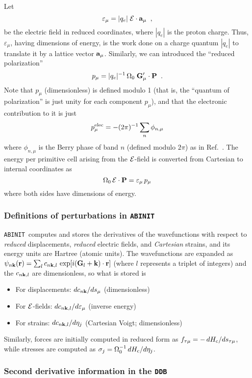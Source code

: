 \documentclass[11pt,fleqn]{article}
\def\beq{\begin{equation}}
\def\eeq{\end{equation}}
\def\P{{\bf P}}
\def\a{{\bf a}}
\def\E{{\cal E}}
\def\G{{\bf G}}
\def\r{{\bf r}}
\def\k{{\bf k}}
\def\Oo{\Omega_0}
\def\bc{_{\rm c}}
\def\veps{\varepsilon}
\def\ABINIT{{{\tt ABINIT}}}
\def\DDB{{\tt DDB}}
\begin{document}
Let
%
\beq
\veps_\mu=|q_e|\;\E\cdot \a_\mu \;\;,
\eeq
%
be the electric field in reduced coordinates, where $|q_e|$ is the
proton charge.  Thus, $\veps_\mu$, having dimensions of energy, is
the work done on a charge quantum $|q_e|$ to translate it by a lattice
vector $\a_\mu$.  Similarly, we can introduced the ``reduced
polarization''
%
\beq
p_\mu=|q_e|^{-1}\,\Oo\;\G'_\mu\cdot\P
\;\;.
\eeq
%
Note that $p_\mu$ (dimensionless) is defined modulo 1
(that is, the ``quantum of
polarization'' is just unity for each component $p_\mu$), and
that the electronic contribution to it is just
%
\beq
p_\mu^{\rm elec}=-(2\pi)^{-1}\sum_n\phi_{n,\mu}
\label{eq:pelec}
\eeq
%
where $\phi_{n,\mu}$ is the Berry phase of band $n$ (defined modulo
$2\pi$) as in Ref.~\cite{dv-piezo}.  The energy per primitive cell
arising from the $\E$-field is converted from Cartesian to internal
coordinates as
%
\beq
\Oo\,\E\cdot\P=\veps_\mu\,p_\mu
\label{eq:epterm}
\eeq
%
where both sides have dimensions of energy.

\subsubsection{Definitions of perturbations in \ABINIT}

\ABINIT\ computes and stores the
derivatives of the wavefunctions with respect to {\it reduced}
displacements, {\it reduced} electric fields, and {\it Cartesian}
strains, and its energy units are Hartree (atomic units).
The wavefunctions are expanded as $\psi_{n\k}(\r)=\sum_l c_{n\k,l}\,
\exp[i(\G_l+\k)\cdot\r]$ (where $l$ represents a triplet of integers)
and the $c_{n\k,l}$ are dimensionless, so what is stored is
%
\begin{itemize}
\item For displacements: $d c_{n\k}/d s_\mu$ (dimensionless)
\item For $\E$-fields: $d c_{n\k,l}/d \veps_\mu$ (inverse energy)
\item For strains: $d c_{n\k,l}/d \eta_j$ (Cartesian Voigt;
   dimensionless)
\end{itemize}
%
Similarly, forces are initially computed in reduced form
as $f_{\tau\mu}=-\,dH\bc/ds_{\tau\mu}$, while stresses are
computed as $\sigma_j=\Oo^{-1}\,dH\bc/d\eta_j$.

\subsubsection{Second derivative information in the \DDB}
\label{sec:ddbinfo}
\end{document}
